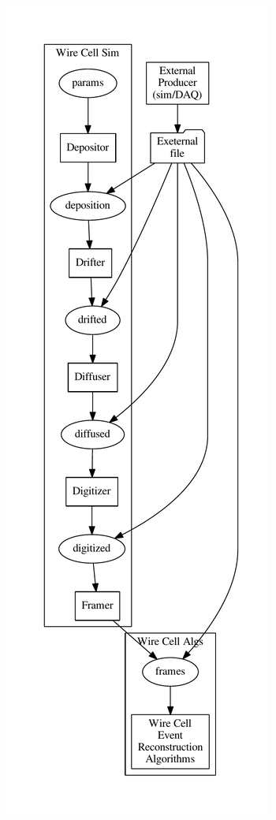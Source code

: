 \documentclass[xcolor=dvipsnames]{beamer}
\begin{document}
\begin{frame}
\begin{columns}
\begin{column}{0.25\textwidth}
      \includegraphics[width=\textwidth]{sim-flow.pdf}
    \end{column}
  \end{columns}
\end{frame}
\end{document}
